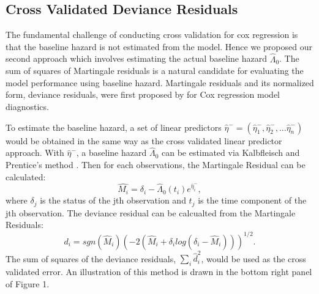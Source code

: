     
  \subsection{Cross Validated Deviance Residuals}

The fundamental challenge of conducting cross validation for cox regression is that the baseline hazard is not estimated from the model. Hence we proposed our second approach which involves estimating the actual baseline hazard $\hat{\Lambda}_{0}$. The sum of squares of Martingale residuals is a natural candidate for evaluating the model performance using baseline hazard. Martingale residuals and its normalized form, deviance residuals, were first proposed by \citep{Therneau1990} for Cox regression model diagnostics. 

To estimate the baseline hazard, a set of linear predictors $\hat{\eta}^{-} = ( \hat{\eta}^{-}_{1},  \hat{\eta}^{-}_{2} , ...  \hat{\eta}^{-}_{n})$ would be obtained in the same way as the cross validated linear predictor approach. With $\hat{\eta}^{-}$, a baseline hazard $\hat{\Lambda}_{0}$ can be estimated via Kalbfleisch and Prentice's method \citep{Kalbfleisch2011}. Then for each observations, the Martingale Residual can be calculated: 
	\begin{equation}
	\hat{M_{i}} = \delta_{i} -\hat{\Lambda}_{0}(t_{i})e^{\hat{\eta}^{-}_{i}},
	\end{equation} 
where $\delta_{j}$ is the status of the jth observation and $t_{j}$ is the time component of the jth observation. The deviance residual can be calcualted from the Martingale Residuals: 
	\begin{equation} 
	d_{i} = sgn(\hat{M}_{i})(-2(\hat{M}_{i} + \delta_{i}log(\delta_{i} - \hat{M}_{i})))^{1/2}.
	\end{equation}
 The sum of squares of the deviance residuals, $\sum_{i}\hat{d}_{i}^2$, would be used as the cross validated error. An illustration of this method is drawn in the bottom right panel of Figure 1.

